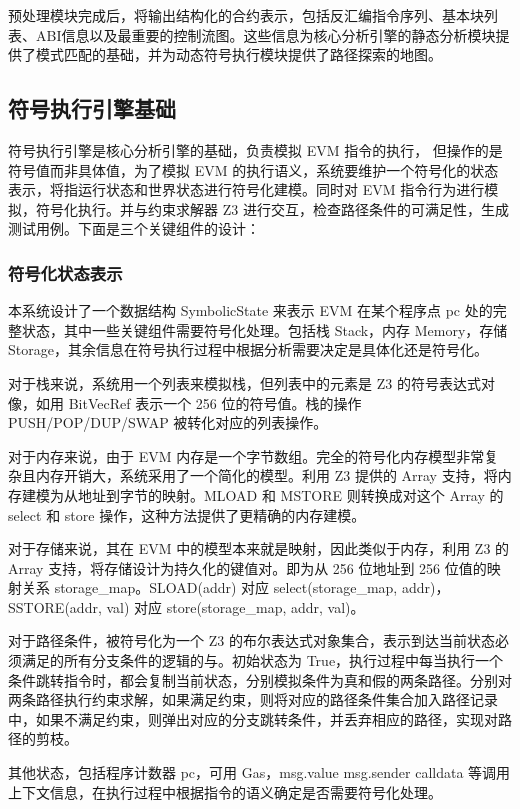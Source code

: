 \documentclass[print, master, vlined, timesmath]{DissertUESTC}
\begin{document}
预处理模块完成后，将输出结构化的合约表示，包括反汇编指令序列、基本块列表、ABI信息以及最重要的控制流图。这些信息为核心分析引擎的静态分析模块提供了模式匹配的基础，并为动态符号执行模块提供了路径探索的地图。



\subsection{符号执行引擎基础}

符号执行引擎是核心分析引擎的基础，负责模拟 EVM 指令的执行，
但操作的是符号值而非具体值，为了模拟 EVM 的执行语义，系统要维护一个符号化的状态表示，将指运行状态和世界状态进行符号化建模。同时对 EVM 指令行为进行模拟，符号化执行。并与约束求解器 Z3 进行交互，检查路径条件的可满足性，生成测试用例。下面是三个关键组件的设计：

\subsubsection{符号化状态表示}
本系统设计了一个数据结构 SymbolicState 来表示 EVM 在某个程序点 pc 处的完整状态，其中一些关键组件需要符号化处理。包括栈 Stack，内存 Memory，存储 Storage，其余信息在符号执行过程中根据分析需要决定是具体化还是符号化。

对于栈来说，系统用一个列表来模拟栈，但列表中的元素是 Z3 的符号表达式对像，如用 BitVecRef 表示一个 256 位的符号值。栈的操作 PUSH/POP/DUP/SWAP 被转化对应的列表操作。

对于内存来说，由于 EVM 内存是一个字节数组。完全的符号化内存模型非常复杂且内存开销大，系统采用了一个简化的模型。利用 Z3 提供的 Array 支持，将内存建模为从地址到字节的映射。MLOAD 和 MSTORE 则转换成对这个 Array 的 select 和 store 操作，这种方法提供了更精确的内存建模。

对于存储来说，其在 EVM 中的模型本来就是映射，因此类似于内存，利用 Z3 的 Array 支持，将存储设计为持久化的键值对。即为从 256 位地址到 256 位值的映射关系 storage\_map。SLOAD(addr) 对应 select(storage\_map, addr)，SSTORE(addr, val) 对应 store(storage\_map, addr, val)。

对于路径条件，被符号化为一个 Z3 的布尔表达式对象集合，表示到达当前状态必须满足的所有分支条件的逻辑的与。初始状态为 True，执行过程中每当执行一个条件跳转指令时，都会复制当前状态，分别模拟条件为真和假的两条路径。分别对两条路径执行约束求解，如果满足约束，则将对应的路径条件集合加入路径记录中，如果不满足约束，则弹出对应的分支跳转条件，并丢弃相应的路径，实现对路径的剪枝。

其他状态，包括程序计数器 pc，可用 Gas，msg.value msg.sender calldata 等调用上下文信息，在执行过程中根据指令的语义确定是否需要符号化处理。
\end{document}
